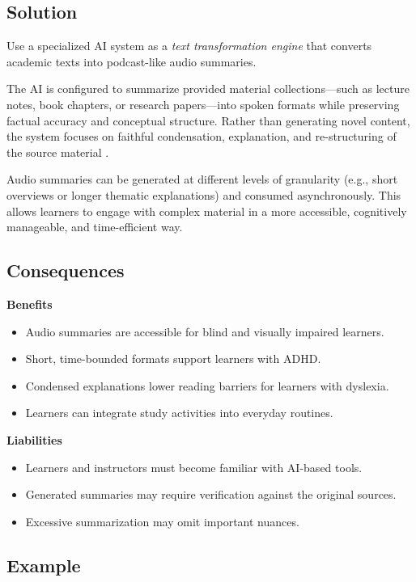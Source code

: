 \subsection*{Solution}
\begin{sol}
Use a specialized AI system as a \emph{text transformation engine} that converts academic texts into podcast-like audio summaries.
\end{sol}

The AI is configured to summarize provided material collections—such as lecture notes, book chapters, or research papers—into spoken formats while preserving factual accuracy and conceptual structure. Rather than generating novel content, the system focuses on faithful condensation, explanation, and re-structuring of the source material \cite{holmes2019}.

Audio summaries can be generated at different levels of granularity (e.g., short overviews or longer thematic explanations) and consumed asynchronously. This allows learners to engage with complex material in a more accessible, cognitively manageable, and time-efficient way.

\subsection*{Consequences}

\textbf{Benefits}
\begin{itemize}
    \item[$+$] Audio summaries are accessible for blind and visually impaired learners.
    \item[$+$] Short, time-bounded formats support learners with ADHD.
    \item[$+$] Condensed explanations lower reading barriers for learners with dyslexia.
    \item[$+$] Learners can integrate study activities into everyday routines.
\end{itemize}

\textbf{Liabilities}
\begin{itemize}
    \item[$-$] Learners and instructors must become familiar with AI-based tools.
    \item[$-$] Generated summaries may require verification against the original sources.
    \item[$-$] Excessive summarization may omit important nuances.
\end{itemize}

\subsection*{Example}

